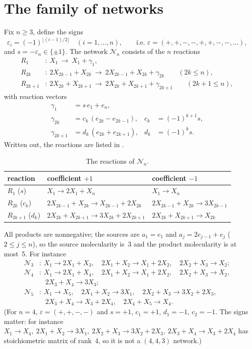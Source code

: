 \documentclass[11pt,a4paper]{report}
\newcommand{\Net}{\mathcal N}
\begin{document}
\section{The family of networks}\label{sec:family}

Fix \(n\ge3\), define the signs
\[
\varepsilon_i=(-1)^{\lfloor (i-1)/2\rfloor}\quad(i=1,\dots,n),\qquad\text{i.e. } \varepsilon=(+,+,-,-,+,+,-,-,\dots),
\]
and \(s=-\varepsilon_n\in\{\pm1\}\). The network \(\Net_n\) consists of the \(n\) reactions
\[
\begin{aligned}
R_1&:\ X_1\ \longrightarrow\ X_1+\gamma_1,\\
R_{2k}&:\ 2X_{2k-1}+X_{2k}\ \longrightarrow\ 2X_{2k-1}+X_{2k}+\gamma_{2k}\qquad(2k\le n),\\
R_{2k+1}&:\ 2X_{2k}+X_{2k+1}\ \longrightarrow\ 2X_{2k}+X_{2k+1}+\gamma_{2k+1}\qquad(2k+1\le n),
\end{aligned}
\]
with reaction vectors
\[
\begin{aligned}
\gamma_1&=s\,e_1+e_n,\\
\gamma_{2k}&=c_k\,(e_{2k}-e_{2k-1}), & c_k&=(-1)^{k+1}s,\\
\gamma_{2k+1}&=d_k\,(e_{2k}+e_{2k+1}), & d_k&=(-1)^{k}s .
\end{aligned}
\]
Written out, the reactions are listed in .

\begin{table}[h]
\centering\small
\caption{The reactions of \(\Net_n\).}\label{tab:reactions}
\begin{tabular}{lll}
\toprule
reaction & coefficient \(+1\) & coefficient \(-1\)\\
\midrule
\(R_1\) (\(s\)) & \(X_1\to 2X_1+X_n\) & \(X_1\to X_n\)\\
\(R_{2k}\) (\(c_k\)) & \(2X_{2k-1}+X_{2k}\to X_{2k-1}+2X_{2k}\) & \(2X_{2k-1}+X_{2k}\to 3X_{2k-1}\)\\
\(R_{2k+1}\) (\(d_k\)) & \(2X_{2k}+X_{2k+1}\to 3X_{2k}+2X_{2k+1}\) & \(2X_{2k}+X_{2k+1}\to X_{2k}\)\\
\bottomrule
\end{tabular}
\end{table}

All products are nonnegative; the sources are \(a_1=e_1\) and \(a_j=2e_{j-1}+e_j\) (\(2\le j\le n\)), so the source
molecularity is~3 and the product molecularity is at most~5. For instance
\begin{align*}
\Net_3&:\ X_1\to 2X_1+X_3,\quad 2X_1+X_2\to X_1+2X_2,\quad 2X_2+X_3\to X_2;\\
\Net_4&:\ X_1\to 2X_1+X_4,\quad 2X_1+X_2\to X_1+2X_2,\quad 2X_2+X_3\to X_2,\\
&\phantom{:}\ \ 2X_3+X_4\to 3X_3;\\
\Net_5&:\ X_1\to X_5,\quad 2X_1+X_2\to 3X_1,\quad 2X_2+X_3\to 3X_2+2X_3,\\
&\phantom{:}\ \ 2X_3+X_4\to X_3+2X_4,\quad 2X_4+X_5\to X_4.
\end{align*}
(For \(n=4\), \(\varepsilon=(+,+,-,-)\) and \(s=+1\), \(c_1=+1\), \(d_1=-1\), \(c_2=-1\). The signs matter: for
instance \(X_1\to X_4,\ 2X_1+X_2\to 3X_1,\ 2X_2+X_3\to 3X_2+2X_3,\ 2X_3+X_4\to X_3+2X_4\) has stoichiometric
matrix of rank~4, so it is not a \((4,4,3)\) network.)
\end{document}
